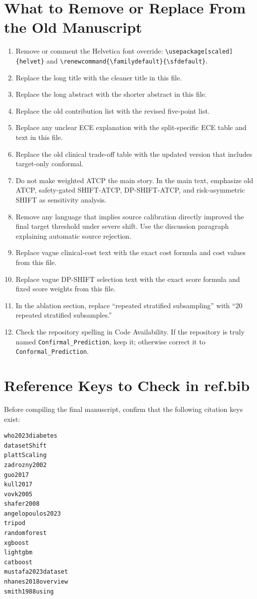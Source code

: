\documentclass[11pt]{article}
\begin{document}
\section{What to Remove or Replace From the Old Manuscript}
\begin{enumerate}
    \item Remove or comment the Helvetica font override:
    \texttt{\textbackslash usepackage[scaled]\{helvet\}} and
    \texttt{\textbackslash renewcommand\{\textbackslash familydefault\}\{\textbackslash sfdefault\}}.
    \item Replace the long title with the cleaner title in this file.
    \item Replace the long abstract with the shorter abstract in this file.
    \item Replace the old contribution list with the revised five-point list.
    \item Replace any unclear ECE explanation with the split-specific ECE table and text in this file.
    \item Replace the old clinical trade-off table with the updated version that includes target-only conformal.
    \item Do not make weighted ATCP the main story. In the main text, emphasize old ATCP, safety-gated SHIFT-ATCP, DP-SHIFT-ATCP, and risk-asymmetric SHIFT as sensitivity analysis.
    \item Remove any language that implies source calibration directly improved the final target threshold under severe shift. Use the discussion paragraph explaining automatic source rejection.
    \item Replace vague clinical-cost text with the exact cost formula and cost values from this file.
    \item Replace vague DP-SHIFT selection text with the exact score formula and fixed score weights from this file.
    \item In the ablation section, replace ``repeated stratified subsampling'' with ``20 repeated stratified subsamples.''
    \item Check the repository spelling in Code Availability. If the repository is truly named \texttt{Confirmal\_Prediction}, keep it; otherwise correct it to \texttt{Conformal\_Prediction}.
\end{enumerate}

\section{Reference Keys to Check in ref.bib}
Before compiling the final manuscript, confirm that the following citation keys exist:
\begin{verbatim}
who2023diabetes
datasetShift
plattScaling
zadrozny2002
guo2017
kull2017
vovk2005
shafer2008
angelopoulos2023
tripod
randomforest
xgboost
lightgbm
catboost
mustafa2023dataset
nhanes2018overview
smith1988using
\end{verbatim}
\end{document}
